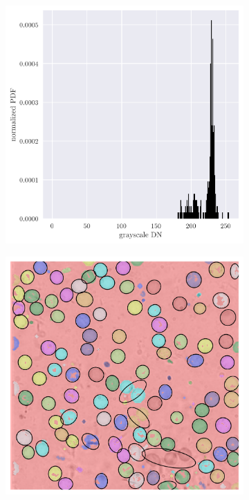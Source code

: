 \documentclass[12pt,a4paper]{article}
\begin{document}
\begin{figure}[htb]
\begin{subfigure}[h!]{0.49\textwidth}
		\includegraphics[width=\textwidth]{gray_hist.png}
		\caption{}
		\label{fig:gray-hist}
	\end{subfigure}
	\begin{subfigure}[h!]{0.49\textwidth}
		\centering
		\includegraphics[width=\textwidth]{cell_blobs.png}

\end{subfigure}
\end{figure}
\end{document}
